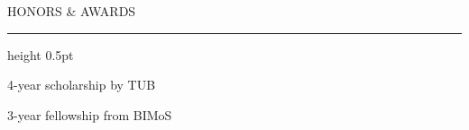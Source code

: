 \documentclass[11pt,a4paper]{moderncv}
\newcommand{\cvsection}[1]{%
  {\large\bfseries\noindent\textcolor{color1}{\strut #1}\par}%
  \nointerlineskip
  \vspace{0.4mm}%
  {\color{color1}\hrule height 0.5pt}%
  \nobreak\vspace{1.8mm}%
}
\begin{document}
\begin{minipage}[t][\colheight][s]{0.345\textwidth}
\cvsection{HONORS \& AWARDS}
\noindent\strut{}4-year scholarship by TUB\par
\noindent{}3-year fellowship from BIMoS\par
\unskip
\end{minipage}
\end{document}
